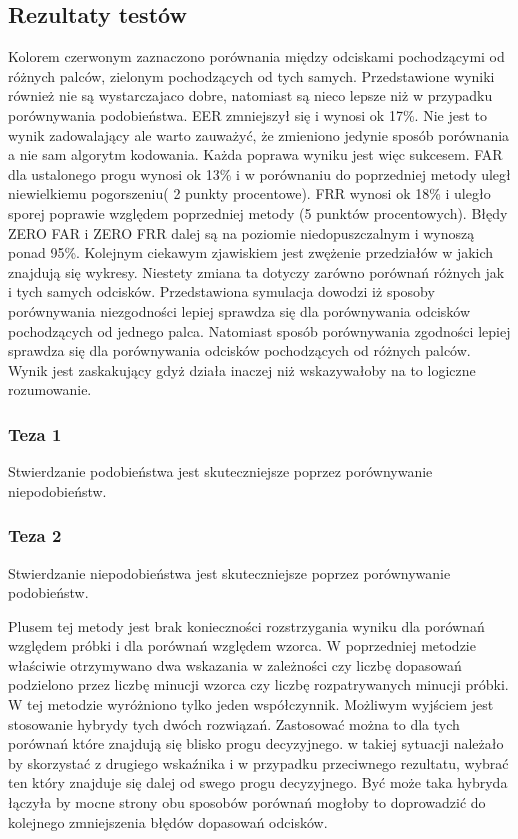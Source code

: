 \subsection{Rezultaty testów}
Kolorem czerwonym zaznaczono porównania między odciskami pochodzącymi od różnych palców, zielonym pochodzących od tych samych. Przedstawione wyniki również nie są wystarczajaco dobre, natomiast są nieco lepsze niż w przypadku porównywania podobieństwa. EER zmniejszył się i wynosi ok 17\%. Nie jest to wynik zadowalający ale warto zauważyć, że zmieniono jedynie sposób porównania a nie sam algorytm kodowania. Każda poprawa wyniku jest więc sukcesem. FAR dla ustalonego progu wynosi ok 13\% i w porównaniu do poprzedniej metody uległ niewielkiemu pogorszeniu( 2 punkty procentowe). FRR wynosi ok 18\% i uległo sporej poprawie względem poprzedniej metody (5 punktów procentowych). Błędy ZERO FAR i ZERO FRR dalej są na poziomie niedopuszczalnym i wynoszą ponad 95\%. Kolejnym ciekawym zjawiskiem jest zwężenie przedziałów w jakich znajdują się wykresy. Niestety zmiana ta dotyczy zarówno porównań różnych jak i tych samych odcisków. Przedstawiona symulacja dowodzi iż sposoby porównywania niezgodności lepiej sprawdza się dla porównywania odcisków pochodzących od jednego palca. Natomiast sposób porównywania zgodności lepiej sprawdza się dla porównywania odcisków pochodzących od różnych palców. Wynik jest zaskakujący gdyż działa inaczej niż wskazywałoby na to logiczne rozumowanie. 

\subsubsection{Teza 1}
Stwierdzanie podobieństwa jest skuteczniejsze poprzez porównywanie niepodobieństw.

\subsubsection{Teza 2}
Stwierdzanie niepodobieństwa jest skuteczniejsze poprzez porównywanie podobieństw.
\vspace{.5cm}\par

Plusem tej metody jest brak konieczności rozstrzygania wyniku dla porównań względem próbki i dla porównań względem wzorca. W poprzedniej metodzie właściwie otrzymywano dwa wskazania w zależności czy liczbę dopasowań podzielono przez liczbę minucji wzorca czy liczbę rozpatrywanych minucji próbki. W tej metodzie wyróżniono tylko jeden współczynnik. Możliwym wyjściem jest stosowanie hybrydy tych dwóch rozwiązań. Zastosować można to dla tych porównań które znajdują się blisko progu decyzyjnego. w takiej sytuacji należało by skorzystać z drugiego wskaźnika i w przypadku przeciwnego rezultatu, wybrać ten który znajduje się dalej od swego progu decyzyjnego. Być może taka hybryda łączyła by mocne strony obu sposobów porównań mogłoby to doprowadzić do kolejnego zmniejszenia błędów dopasowań odcisków. 


